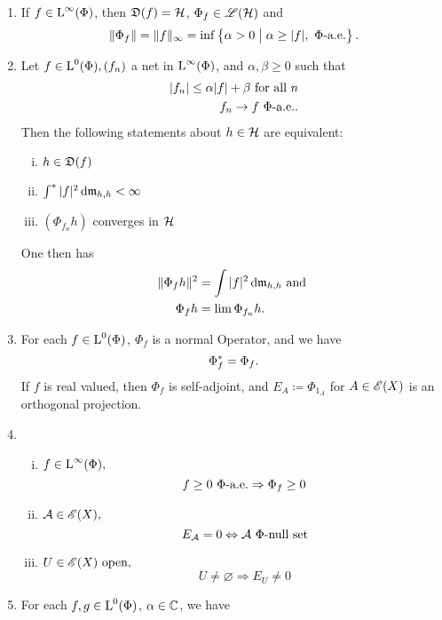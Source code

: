 \begin{thrm} \label{maintheorem}
  \leavevmode
  \begin{enumerate}[\normalfont 1.]
   \item   

 If $f \in {\text{L}^\infty }(\Phi)$, then $\mathfrak{D}(f) = \mathcal{H}$, $ \Phi_f \in \mathscr{L}(\mathcal{H})$ and
 \[
 \| \Phi_f \| = \| f\|_\infty = \inf \left\lbrace \alpha > 0 \bigm | \alpha \geq |f|, ~\Phi\text{-a.e.}\right\rbrace.
 \]

 
\item 
Let $f \in {\text{L}^0}(\Phi), (f_n)$ a net in ${\text{L}^\infty}(\Phi)$, and $\alpha, \beta \geq 0$ such that
 \begin{align*}
   | f_n | \leq \alpha |f| + \beta \text{ for all } n \\
   f_n \to f ~\Phi\text{-a.e.}.
 \end{align*}
Then the following statements about $h \in \mathcal{H}$ are equivalent:
\begin{enumerate}[(i)]
 \item $h \in \mathfrak{D}(f)$
 \item $\int ^{*} | f| ^2 \operatorname{d}\! \mathfrak{m}_{h,h} < \infty$
 \item $(\Phi_{f_n}h)$ converges in $ \mathcal{H}$
\end{enumerate}
One then has
\begin{align*}
  \| \Phi_f h \| ^2 &= \int |f|^2 \operatorname{d}\! \mathfrak{m}_{h, h } \text{ and }\\
  \Phi_{f }h &= \lim \Phi_{f_n} h.
\end{align*}

\item
For each $f \in {\text{L}^0}(\Phi)$, $\Phi_f$ is a normal Operator, and we have
\[
 \Phi_f ^{*} = \Phi_f. 
\]
If $f$ is real valued, then $\Phi_f$ is self-adjoint, and $E_A \coloneqq 
\Phi_{1_A} $ for $ A \in \mathscr{E}(X)$ is an orthogonal projection. 
\item
\begin{enumerate}[(i)]
  \item $f \in {\text{L}^\infty }(\Phi),$ 
  \[
   f \geq 0 ~\Phi\text{-a.e.} \Rightarrow \Phi_f \geq 0
  \]

  \item $\mathcal{A} \in \mathscr{E}(X),$
  \[
  E_\mathcal{A} =0  \Leftrightarrow \mathcal{A} ~\Phi\text{-null set}
  \]
  \item $U \in \mathscr{E}(X)\text{ open,}$ 
  \[
   U \neq \varnothing \Rightarrow E_U \neq 0
  \]

 \end{enumerate}


\item 
For each $f, g \in {\text{L}^0}(\Phi)$, $\alpha \in \mathbb{C}$, we have


\end{enumerate}
\end{thrm}
